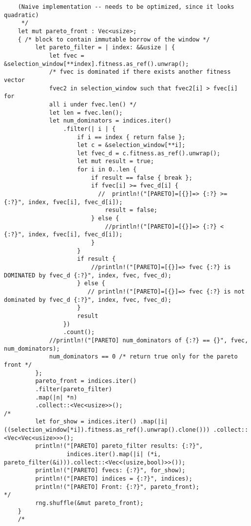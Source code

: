 \documentclass[11pt]{article}
\begin{document}
\begin{lstlisting}
    (Naive implementation -- needs to be optimized, since it looks quadratic)
     */
    let mut pareto_front : Vec<usize>;
    { /* block to contain immutable borrow of the window */
         let pareto_filter = | index: &&usize | {
             let fvec = &selection_window[**index].fitness.as_ref().unwrap();
             /* fvec is dominated if there exists another fitness vector
             fvec2 in selection_window such that fvec2[i] > fvec[i] for
             all i under fvec.len() */
             let len = fvec.len();
             let num_dominators = indices.iter()
                 .filter(| i | {
                     if i == index { return false };
                     let c = &selection_window[**i];
                     let fvec_d = c.fitness.as_ref().unwrap();
                     let mut result = true;
                     for i in 0..len {
                         if result == false { break };
                         if fvec[i] >= fvec_d[i] {
                           //  println!("[PARETO]=[{}]=> {:?} >= {:?}", index, fvec[i], fvec_d[i]);
                             result = false;
                         } else {
                             //println!("[PARETO]=[{}]=> {:?} <  {:?}", index, fvec[i], fvec_d[i]);
                         }
                     }
                     if result {
                         //println!("[PARETO]=[{}]=> fvec {:?} is DOMINATED by fvec_d {:?}", index, fvec, fvec_d);
                     } else {
                        // println!("[PARETO]=[{}]=> fvec {:?} is not dominated by fvec_d {:?}", index, fvec, fvec_d);
                     }
                     result
                 })
                 .count();
             //println!("[PARETO] num_dominators of {:?} == {}", fvec, num_dominators);
             num_dominators == 0 /* return true only for the pareto front */
         };
         pareto_front = indices.iter()
         .filter(pareto_filter)
         .map(|n| *n)
         .collect::<Vec<usize>>();
/*
         let for_show = indices.iter() .map(|i| ((selection_window[*i]).fitness.as_ref().unwrap().clone())) .collect::<Vec<Vec<usize>>>();
         println!("[PARETO] pareto_filter results: {:?}",
                  indices.iter().map(|i| (*i, pareto_filter(&i))).collect::<Vec<(usize,bool)>>());
         println!("[PARETO] fvecs: {:?}", for_show);
         println!("[PARETO] indices = {:?}", indices);
         println!("[PARETO] Front: {:?}", pareto_front);
*/
         rng.shuffle(&mut pareto_front);
    }
    /*


\end{lstlisting}
\end{document}
